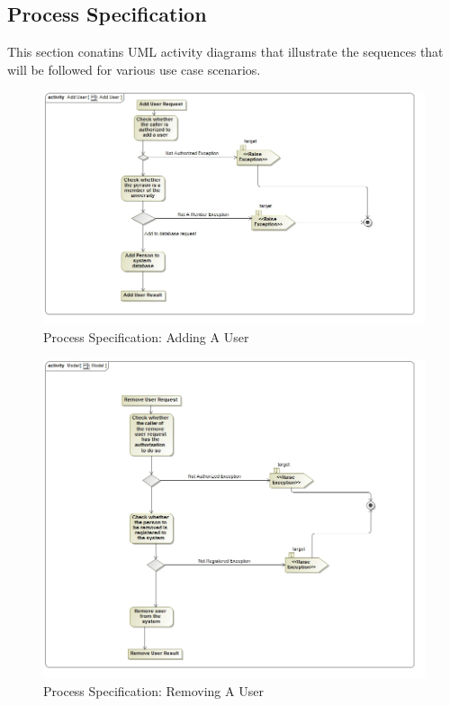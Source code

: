 \documentclass[a4paper]{article}
\begin{document}
		\subsection{Process Specification}
	This section conatins UML activity diagrams that illustrate the sequences that will be followed for various use case scenarios.
	\begin{figure}[H]
	    \centering
	    \includegraphics[width=\textwidth]{AddUser.jpg}
	    \caption{Process Specification: Adding A User}
	\end{figure}
	\begin{figure}[H]
	    \centering
	    \includegraphics[width=\textwidth]{removeUser.jpg}
	    \caption{Process Specification: Removing A User}
	\end{figure}
\end{document}
